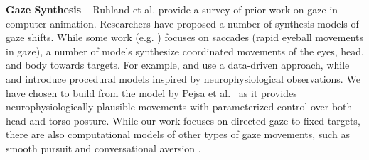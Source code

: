 \noindent\textbf{Gaze Synthesis} -- Ruhland et al.  provide a survey of prior work on gaze in computer animation. Researchers have proposed a number of synthesis models of gaze shifts. While some work (e.g. \cite{deng2005automated,lee2002eyes}) focuses on saccades (rapid eyeball movements in gaze), a number of models synthesize coordinated movements of the eyes, head, and body towards targets. For example, \cite{lance2010expressive} and \cite{heck2007automated} use a data-driven approach, while \cite{peters2010animating} and \cite{andrist2012headeye} introduce procedural models inspired by neurophysiological observations. We have chosen to build from the model by Pejsa et al.~ as it provides neurophysiologically plausible movements with parameterized control over both head and torso posture. While our work focuses on directed gaze to fixed targets, there are also computational models of other types of gaze movements, such as smooth pursuit \cite{yeo2012eyecatch} and conversational aversion \cite{andrist2013aversion}.
